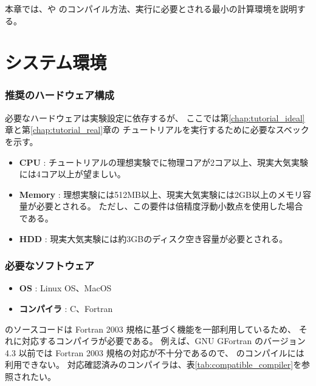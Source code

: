 
本章では、\scalelib や \scalerm のコンパイル方法、実行に必要とされる最小の計算環境を説明する。

\section{システム環境} \label{sec:req_env}
\subsubsection{\bf 推奨のハードウェア構成}

必要なハードウェアは実験設定に依存するが、
ここでは第\ref{chap:tutorial_ideal}章と第\ref{chap:tutorial_real}章の
チュートリアルを実行するために必要なスベックを示す。

  \begin{itemize}
    \item {\bf CPU} : チュートリアルの理想実験でに物理コアが2コア以上、現実大気実験には4コア以上が望ましい。
    \item {\bf Memory} : 理想実験には512MB以上、現実大気実験には2GB以上のメモリ容量が必要とされる。 ただし、この要件は倍精度浮動小数点を使用した場合である。
    \item {\bf HDD} : 現実大気実験には約3GBのディスク空き容量が必要とされる。
  \end{itemize}

\subsubsection{\bf 必要なソフトウェア}
  \begin{itemize}
  \item {\bf OS} : Linux OS、MacOS
  \item {\bf コンパイラ} : C、Fortran
  \end{itemize}

  \scalelib のソースコードは Fortran 2003 規格に基づく機能を一部利用しているため、
  それに対応するコンパイラが必要である。
  例えば、GNU GFortran のバージョン 4.3 以前では Fortran 2003 規格の対応が不十分であるので、
  \scalelib のコンパイルには利用できない。
  対応確認済みのコンパイラは、表\ref{tab:compatible_compiler}を参照されたい。

